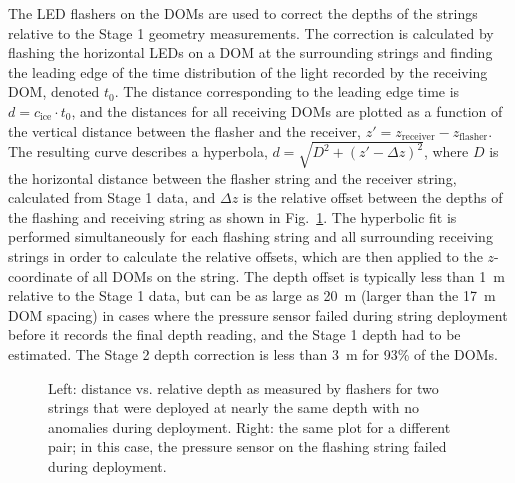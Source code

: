 The LED flashers on the DOMs are used to correct the depths of the strings relative to
the Stage 1 geometry measurements. The correction is calculated by flashing
the horizontal LEDs on a DOM at the surrounding strings and finding the
leading edge of the time distribution of the light recorded by the
receiving DOM, denoted $t_0$. The distance corresponding to the leading
edge time is $d = c_{\mathrm{ice}} \cdot t_0$, and the distances for all receiving
DOMs are plotted as a function of the vertical distance between the flasher
and the receiver, $z' = z_{\mathrm{receiver}} - z_{\mathrm{flasher}}$. The resulting curve
describes a hyperbola, $d = \sqrt{D^2 + (z' -\Delta z)^2}$, where $D$ is
the horizontal distance between the flasher string and the receiver string,
calculated from Stage 1 data, and $\Delta z$ is the relative offset between
the depths of the flashing and receiving string as shown in
Fig.~\ref{fig:geohyperbola}. The hyperbolic fit is performed simultaneously for
each flashing string and all surrounding receiving strings in order to
calculate the relative offsets, which are then applied to the $z$-coordinate
of all DOMs on the string. The depth offset is typically less than 1~m
relative to the Stage 1 data, but can be as large as 20~m (larger than the
17~m DOM spacing) in cases where the pressure sensor failed during string
deployment before it records the final depth reading, and the Stage 1 depth
had to be estimated. The Stage 2 depth correction is less than 3~m for 93\%
of the DOMs.

\begin{figure}[!ht]
  \captionsetup[subfigure]{labelformat=empty} \centering
  \caption{Left: distance vs. relative depth as measured by flashers for
    two strings that were deployed at nearly the same depth with no
    anomalies during deployment. Right: the same plot for a different pair;
    in this case, the pressure sensor on the flashing string failed during
    deployment.}
  \label{fig:geohyperbola}
\end{figure}


